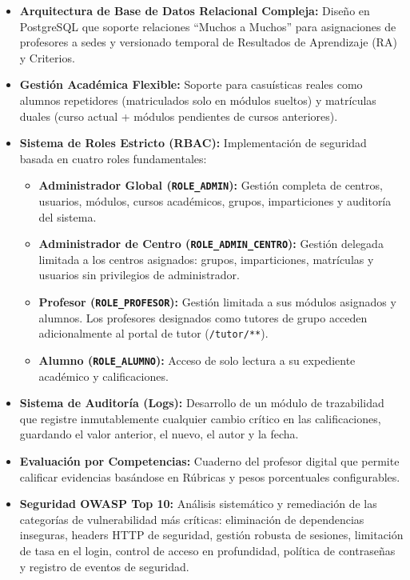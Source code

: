 \documentclass[12pt, a4paper]{report}
\begin{document}
\begin{itemize}
  \item \textbf{Arquitectura de Base de Datos Relacional Compleja:} Dise\~no en PostgreSQL que soporte relaciones ``Muchos a Muchos'' para asignaciones de profesores a sedes y versionado temporal de Resultados de Aprendizaje (RA) y Criterios.
  \item \textbf{Gestión Académica Flexible:} Soporte para casuísticas reales como alumnos repetidores (matriculados solo en módulos sueltos) y matrículas duales (curso actual + módulos pendientes de cursos anteriores).
  \item \textbf{Sistema de Roles Estricto (RBAC):} Implementación de seguridad basada en cuatro roles fundamentales:
    \begin{itemize}
      \item \textbf{Administrador Global (\texttt{ROLE\_ADMIN}):} Gestión completa de centros, usuarios, módulos, cursos académicos, grupos, imparticiones y auditoría del sistema.
      \item \textbf{Administrador de Centro (\texttt{ROLE\_ADMIN\_CENTRO}):} Gestión delegada limitada a los centros asignados: grupos, imparticiones, matrículas y usuarios sin privilegios de administrador.
      \item \textbf{Profesor (\texttt{ROLE\_PROFESOR}):} Gestión limitada a sus módulos asignados y alumnos. Los profesores designados como tutores de grupo acceden adicionalmente al portal de tutor (\texttt{/tutor/**}).
      \item \textbf{Alumno (\texttt{ROLE\_ALUMNO}):} Acceso de solo lectura a su expediente académico y calificaciones.
    \end{itemize}
  \item \textbf{Sistema de Auditoría (Logs):} Desarrollo de un módulo de trazabilidad que registre inmutablemente cualquier cambio crítico en las calificaciones, guardando el valor anterior, el nuevo, el autor y la fecha.
  \item \textbf{Evaluación por Competencias:} Cuaderno del profesor digital que permite calificar evidencias basándose en Rúbricas y pesos porcentuales configurables.
  \item \textbf{Seguridad OWASP Top 10:} Análisis sistemático y remediación de las categorías de vulnerabilidad más críticas: eliminación de dependencias inseguras, headers HTTP de seguridad, gestión robusta de sesiones, limitación de tasa en el login, control de acceso en profundidad, política de contraseñas y registro de eventos de seguridad.
\end{itemize}
\end{document}
